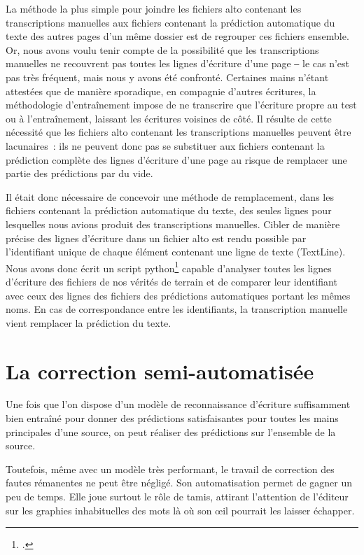 \documentclass[a4paper,12pt,twoside]{book}
\begin{document}
				La méthode la plus simple pour joindre les fichiers \gls{alto} contenant les transcriptions manuelles aux fichiers contenant la \gls{prédiction} automatique du texte des autres pages d'un même dossier est de regrouper ces fichiers ensemble. Or, nous avons voulu tenir compte de la possibilité que les transcriptions manuelles ne recouvrent pas toutes les lignes d'écriture d'une page ‒ le cas n'est pas très fréquent, mais nous y avons été confronté. Certaines mains n'étant attestées que de manière sporadique, en compagnie d'autres écritures, la méthodologie d'entraînement impose de ne transcrire que l'écriture propre au test ou à l'entraînement, laissant les écritures voisines de côté. Il résulte de cette nécessité que les fichiers \gls{alto} contenant les transcriptions manuelles peuvent être lacunaires~: ils ne peuvent donc pas se substituer aux fichiers contenant la \gls{prédiction} complète des lignes d'écriture d'une page au risque de remplacer une partie des \glspl{prédiction} par du vide. 
				
				Il était donc nécessaire de concevoir une méthode de remplacement, dans les fichiers contenant la \gls{prédiction} automatique du texte, des seules lignes pour lesquelles nous avions produit des transcriptions manuelles. Cibler de manière précise des lignes d'écriture dans un fichier \gls{alto} est rendu possible par l'identifiant unique de chaque élément contenant une ligne de texte (\textsf{TextLine}). Nous avons donc écrit un script python\footcite{biayInjectTranscriptPy2022a} capable d'analyser toutes les lignes d'écriture des fichiers de nos vérités de terrain et de comparer leur identifiant avec ceux des lignes des fichiers des \glspl{prédiction} automatiques portant les mêmes noms. En cas de correspondance entre les identifiants, la transcription manuelle vient remplacer la \gls{prédiction} du texte.
			
		\section{La correction semi-automatisée}
			Une fois que l'on dispose d'un modèle de reconnaissance d'écriture suffisamment bien entraîné pour donner des \glspl{prédiction} satisfaisantes pour toutes les mains principales d'une source, on peut réaliser des \glspl{prédiction} sur l'ensemble de la source.
			
			Toutefois, même avec un modèle très performant, le travail de correction des fautes rémanentes ne peut être négligé. Son automatisation permet de gagner un peu de temps. Elle joue surtout le rôle de tamis, attirant l'attention de l'éditeur sur les graphies inhabituelles des mots là où son œil pourrait les laisser échapper.
			
\end{document}
